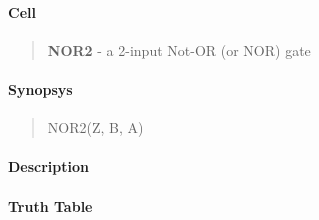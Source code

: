 \label{NOR2}
\paragraph{Cell}
\begin{quote}
    \textbf{NOR2} - a 2-input Not-OR (or NOR) gate
\end{quote}

\paragraph{Synopsys}
\begin{quote}
    NOR2(Z, B, A)
\end{quote}

\paragraph{Description}



\paragraph{Truth Table}


